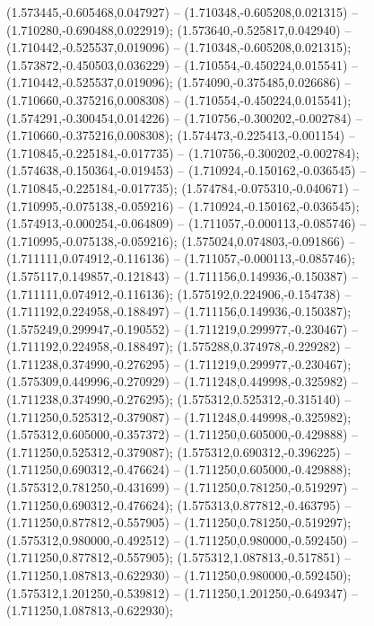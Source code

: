  (1.573445,-0.605468,0.047927) -- (1.710348,-0.605208,0.021315) -- (1.710280,-0.690488,0.022919);
 (1.573640,-0.525817,0.042940) -- (1.710442,-0.525537,0.019096) -- (1.710348,-0.605208,0.021315);
 (1.573872,-0.450503,0.036229) -- (1.710554,-0.450224,0.015541) -- (1.710442,-0.525537,0.019096);
 (1.574090,-0.375485,0.026686) -- (1.710660,-0.375216,0.008308) -- (1.710554,-0.450224,0.015541);
 (1.574291,-0.300454,0.014226) -- (1.710756,-0.300202,-0.002784) -- (1.710660,-0.375216,0.008308);
 (1.574473,-0.225413,-0.001154) -- (1.710845,-0.225184,-0.017735) -- (1.710756,-0.300202,-0.002784);
 (1.574638,-0.150364,-0.019453) -- (1.710924,-0.150162,-0.036545) -- (1.710845,-0.225184,-0.017735);
 (1.574784,-0.075310,-0.040671) -- (1.710995,-0.075138,-0.059216) -- (1.710924,-0.150162,-0.036545);
 (1.574913,-0.000254,-0.064809) -- (1.711057,-0.000113,-0.085746) -- (1.710995,-0.075138,-0.059216);
 (1.575024,0.074803,-0.091866) -- (1.711111,0.074912,-0.116136) -- (1.711057,-0.000113,-0.085746);
 (1.575117,0.149857,-0.121843) -- (1.711156,0.149936,-0.150387) -- (1.711111,0.074912,-0.116136);
 (1.575192,0.224906,-0.154738) -- (1.711192,0.224958,-0.188497) -- (1.711156,0.149936,-0.150387);
 (1.575249,0.299947,-0.190552) -- (1.711219,0.299977,-0.230467) -- (1.711192,0.224958,-0.188497);
 (1.575288,0.374978,-0.229282) -- (1.711238,0.374990,-0.276295) -- (1.711219,0.299977,-0.230467);
 (1.575309,0.449996,-0.270929) -- (1.711248,0.449998,-0.325982) -- (1.711238,0.374990,-0.276295);
 (1.575312,0.525312,-0.315140) -- (1.711250,0.525312,-0.379087) -- (1.711248,0.449998,-0.325982);
 (1.575312,0.605000,-0.357372) -- (1.711250,0.605000,-0.429888) -- (1.711250,0.525312,-0.379087);
 (1.575312,0.690312,-0.396225) -- (1.711250,0.690312,-0.476624) -- (1.711250,0.605000,-0.429888);
 (1.575312,0.781250,-0.431699) -- (1.711250,0.781250,-0.519297) -- (1.711250,0.690312,-0.476624);
 (1.575313,0.877812,-0.463795) -- (1.711250,0.877812,-0.557905) -- (1.711250,0.781250,-0.519297);
 (1.575312,0.980000,-0.492512) -- (1.711250,0.980000,-0.592450) -- (1.711250,0.877812,-0.557905);
 (1.575312,1.087813,-0.517851) -- (1.711250,1.087813,-0.622930) -- (1.711250,0.980000,-0.592450);
 (1.575312,1.201250,-0.539812) -- (1.711250,1.201250,-0.649347) -- (1.711250,1.087813,-0.622930);
